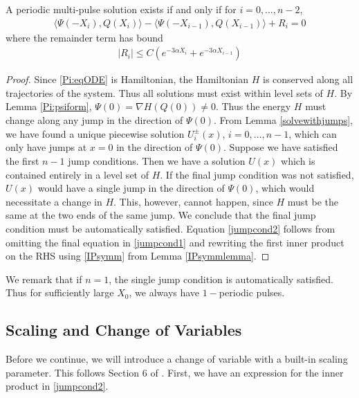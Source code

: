 \documentclass[thesis.tex]{subfiles}
\begin{document}
\begin{lemma}\label{jumplemma2}
A periodic multi-pulse solution exists if and only if for $i = 0, \dots, n-2$,
\begin{align}\label{jumpcond2}
\langle \Psi(-X_i), Q(X_i) \rangle - \langle \Psi(-X_{i-1}), Q(X_{i-1}) \rangle + R_i = 0
\end{align}
where the remainder term has bound
\begin{align*}
|R_i| \leq C ( e^{-3 \alpha X_i} +  e^{-3 \alpha X_{i-1}})
\end{align*}
\begin{proof}
Since \eqref{Pi:eqODE} is Hamiltonian, the Hamiltonian $H$ is conserved along all trajectories of the system. Thus all solutions must exist within level sets of $H$. By Lemma \ref{Pi:psiform}, $\Psi(0) = \nabla H(Q(0)) \neq 0$. Thus the energy $H$ must change along any jump in the direction of $\Psi(0)$. From Lemma \ref{solvewithjumps}, we have found a unique piecewise solution $U_i^\pm(x)$, $i = 0, \dots, n-1$, which can only have jumps at $x = 0$ in the direction of $\Psi(0)$. Suppose we have satisfied the first $n-1$ jump conditions. Then we have a solution $U(x)$ which is contained entirely in a level set of $H$. If the final jump condition was not satisfied, $U(x)$ would have a single jump in the direction of $\Psi(0)$, which would necessitate a change in $H$. This, however, cannot happen, since $H$ must be the same at the two ends of the same jump. We conclude that the final jump condition must be automatically satisfied. Equation \eqref{jumpcond2} follows from omitting the final equation in \eqref{jumpcond1} and rewriting the first inner product on the RHS using \eqref{IPsymm} from Lemma \ref{IPsymmlemma}.
\end{proof}
\end{lemma}

We remark that if $n = 1$, the single jump condition is automatically satisfied. Thus for sufficiently large $X_0$, we always have $1-$periodic pulses. 

\subsection{Scaling and Change of Variables}

Before we continue, we will introduce a change of variable with a built-in scaling parameter. This follows Section 6 of \cite{Sandstede1998}. First, we have an expression for the inner product in \ref{jumpcond2}.

\end{document}
